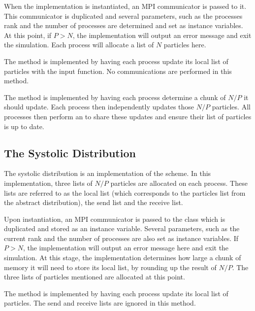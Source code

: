 When the implementation is instantiated, an MPI communicator is passed to it.
%
This communicator is duplicated and several parameters, such as
the processes rank and the number of processes are determined and
set as instance variables.
%
At this point, if $P > N$, the implementation will output an error message
and exit the simulation.
%
Each process will allocate a list of $N$ particles here.

The \individualoperation{} method is implemented by having each process update
its local list of particles with the input function.
%
No communications are performed in this method.

The \pairoperation{} method is implemented by having each process
determine a chunk of $N/P$ it should update.
%
Each process then independently updates those $N/P$ particles.
%
All processes then perform an \mpiallgatherv{} to share these
updates and ensure their list of particles is up to date.


\subsection{The Systolic Distribution}

%
The systolic distribution is an implementation of the \systolicloop{} scheme.
%
In this implementation, three lists of $N/P$ particles are allocated
on each process.
%
These lists are referred to as the local list (which corresponds to
the particles list from the abstract distribution), the send list and the
receive list.

Upon instantiation, an MPI communicator is passed to the class
which is duplicated and stored as an instance variable.
%
Several parameters, such as the current rank and the number of
processes are also set as instance variables.
%
If $P > N$, the implementation will output an error message
here and exit the simulation.
%
At this stage, the implementation determines how large a chunk of
memory it will need to store its local list, by rounding up
the result of $N/P$.
%
The three lists of particles mentioned are allocated at this point.

The \individualoperation{} method is implemented by having each process
update its local list of particles.
%
The send and receive lists are ignored in this method.

